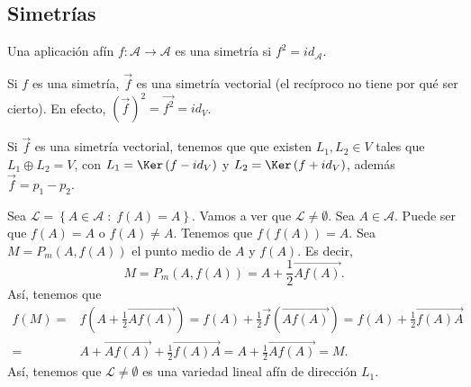 \subsection{Simetrías}
\begin{fdefinition}[Simetría]
\normalfont Una aplicación afín $\displaystyle f : \mathcal{A} \to \mathcal{A} $ es una simetría si $\displaystyle f^{2} = id _{\mathcal{A}} $.
\end{fdefinition}
\begin{observation}
\normalfont Si $\displaystyle f $ es una simetría, $\displaystyle \vec{f} $ es una simetría vectorial (el recíproco no tiene por qué ser cierto). En efecto, $\displaystyle \left(\vec{f}\right)^{2} = \vec{f^{2}} = id _{V} $. 
\end{observation}
\begin{observation}
\normalfont Si $\displaystyle \vec{f} $ es una simetría vectorial, tenemos que que existen $\displaystyle L_{1}, L_{2} \in V $ tales que $\displaystyle L_{1} \oplus L_{2} = V $, con $\displaystyle L_{1} = \Ker\left(f-id _{V}\right) $ y $\displaystyle L_{2} = \Ker\left(f + id _{V}\right) $, además $\displaystyle \vec{f} = p_{1} - p_{2} $.
\end{observation}
\begin{observation}
	\normalfont Sea $\displaystyle \mathcal{L} = \left\{ A \in \mathcal{A} \; : \; f\left(A\right) = A\right\}  $. Vamos a ver que $\displaystyle \mathcal{L} \neq\emptyset $. Sea $\displaystyle A \in \mathcal{A} $. Puede ser que $\displaystyle f\left(A\right)=A $ o $\displaystyle f\left(A\right)\neq A $. Tenemos que $\displaystyle f\left(f\left(A\right)\right) = A $. Sea $\displaystyle M = P_{m}\left(A,f\left(A\right)\right) $ el punto medio de $\displaystyle A $ y $\displaystyle f\left(A\right) $. Es decir, 
	\[M = P_{m}\left(A,f\left(A\right)\right) = A + \frac{1}{2}\overrightarrow{Af\left(A\right)}  .\]
Así, tenemos que 
\[
\begin{split}
	f\left(M\right) = & f\left(A + \frac{1}{2}\overrightarrow{Af\left(A\right)} \right) = f\left(A\right) + \frac{1}{2}\vec{f}\left(\overrightarrow{Af\left(A\right)} \right) = f\left(A\right) +\frac{1}{2}\overrightarrow{f\left(A\right)A}  \\
	= &  A + \overrightarrow{Af\left(A\right)} +\frac{1}{2}\overrightarrow{f\left(A\right)A}  = A + \frac{1}{2}\overrightarrow{Af\left(A\right)}  = M.
\end{split}
\]
Así, tenemos que $\displaystyle \mathcal{L} \neq \emptyset $ es una variedad lineal afín de dirección $\displaystyle L_{1} $.
\end{observation}
